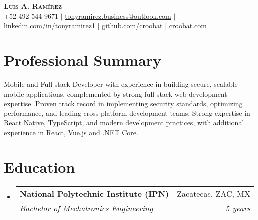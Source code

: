 \documentclass[letterpaper,11pt]{article}
\makeatletter
\newcommand{\resumeSubheading}[4]{
  \vspace{4pt}\item
    \begin{tabular*}{0.97\textwidth}[t]{l@{\extracolsep{\fill}}r}
      \textbf{#1} & #2 \\
      \textit{\small#3} & \textit{\small #4} \\
    \end{tabular*}\vspace{-2pt}
}
\newcommand{\resumeSubHeadingListStart}{\begin{itemize}[leftmargin=0.15in, label={}]}
\newcommand{\resumeSubHeadingListEnd}{\end{itemize}}
\makeatother
\begin{document}
\begin{center}
    \textbf{\Huge \scshape Luis A. Ramírez} \\ \vspace{1pt}
    \small +52 492-544-9671 $|$ \href{tonyramirez.business@outlook.com}{\underline{tonyramirez.business@outlook.com}} $|$
    \href{https://linkedin.com/in/tonyramirez1}{\underline{linkedin.com/in/tonyramirez1}} $|$
    \href{https://github.com/croobat}{\underline{github.com/croobat}} $|$
    \href{https://croobat.com}{\underline{croobat.com}}
\end{center}

\section{Professional Summary}
\begin{itemize}[leftmargin=0.15in, label={}]
\small{
\item{Mobile and Full-stack Developer with experience in building secure, scalable mobile applications, complemented by strong full-stack web development expertise. Proven track record in implementing security standards, optimizing performance, and leading cross-platform development teams. Strong expertise in React Native, TypeScript, and modern development practices, with additional experience in React, Vue.js and .NET Core.}
}
\end{itemize}

\section{Education}
  \resumeSubHeadingListStart
    \resumeSubheading
      {National Polytechnic Institute (IPN)} {Zacatecas, ZAC, MX}
      {Bachelor of Mechatronics Engineering}{5 years}
  \resumeSubHeadingListEnd

\end{document}
